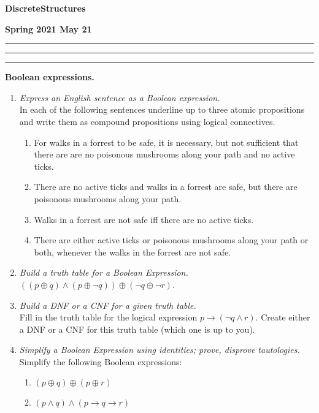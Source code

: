\documentclass[a4paper,12pt]{article}
\begin{document}
\begin{center}
\parbox{3cm}{\flushleft\bf Discrete\linebreak Structures}
\hfill
\parbox{7cm}{}
\hfill
\parbox{3cm}{\flushright\bf Spring 2021 \linebreak May 21}
\end{center}

\hrule\vspace{2pt}\hrule

\hrule


\vspace{10pt}
{\bf Boolean expressions.}

\begin{enumerate}

\item {\small \em
 Express an English sentence as a Boolean expression.}\\
In each of the following sentences underline
up to three atomic propositions and write them as
compound propositions using logical connectives.
\begin{enumerate}
\item For walks in a forrest to be safe, it is necessary, but not
sufficient that there are are no poisonous mushrooms along your path
and no active ticks.
\item There are no active ticks and walks in a forrest are safe, but
there are poisonous mushrooms along your path.
\item Walks in a forrest are not safe iff there are no
active ticks.
\item There are either
active ticks or poisonous mushrooms along your path or both,
whenever the walks in the forrest are not safe.
\end{enumerate}

\item {\small \em
Build a truth table for a Boolean Expression.}\\
$((p \oplus q) \wedge (p \oplus \neg q)) \oplus (\neg q \oplus \neg r)$.

\item {\small \em
Build a DNF or a CNF for a given truth table.}\\
Fill in the truth table for the logical expression $p \rightarrow (\neg q \wedge r)$.
Create either a DNF or a CNF for this
truth table (which one \textendash{} is up to you).

\item {\small \em
Simplify a Boolean Expression using identities; prove, disprove tautologies.}\\
Simplify the following Boolean expressions:
\begin{enumerate}
\item $(p \oplus q) \oplus (p \oplus r)$
\item $(p \wedge q) \wedge (p \rightarrow q \rightarrow r)$
\end{enumerate}



\end{enumerate}
\end{document}
